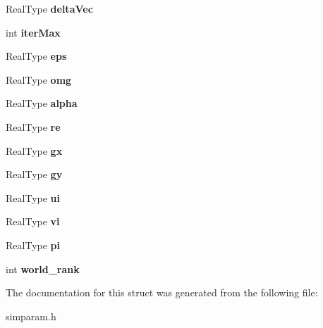 \begin{DoxyCompactItemize}
\item 
\hypertarget{structsimparam_a656107ad929213e2e515214462c8185e}{Real\-Type {\bfseries delta\-Vec}}\label{structsimparam_a656107ad929213e2e515214462c8185e}

\item 
\hypertarget{structsimparam_a79bbef3359096b75c69e9d3ee0e191e9}{int {\bfseries iter\-Max}}\label{structsimparam_a79bbef3359096b75c69e9d3ee0e191e9}

\item 
\hypertarget{structsimparam_aa73922d40040c79309d633bc75888a1f}{Real\-Type {\bfseries eps}}\label{structsimparam_aa73922d40040c79309d633bc75888a1f}

\item 
\hypertarget{structsimparam_ad41bac063fcbdac4cb459585d60b912b}{Real\-Type {\bfseries omg}}\label{structsimparam_ad41bac063fcbdac4cb459585d60b912b}

\item 
\hypertarget{structsimparam_a542c143b3ec3fecd4ba1bd435869c1ad}{Real\-Type {\bfseries alpha}}\label{structsimparam_a542c143b3ec3fecd4ba1bd435869c1ad}

\item 
\hypertarget{structsimparam_a0993ef48f0a704d881f8d6c06372dc6e}{Real\-Type {\bfseries re}}\label{structsimparam_a0993ef48f0a704d881f8d6c06372dc6e}

\item 
\hypertarget{structsimparam_ab9b937c60e739cb22b40f17668236170}{Real\-Type {\bfseries gx}}\label{structsimparam_ab9b937c60e739cb22b40f17668236170}

\item 
\hypertarget{structsimparam_aedf48193c1e7296f01fdc8fdec30c945}{Real\-Type {\bfseries gy}}\label{structsimparam_aedf48193c1e7296f01fdc8fdec30c945}

\item 
\hypertarget{structsimparam_a5d484933d237f50a481fb6daa4f078fd}{Real\-Type {\bfseries ui}}\label{structsimparam_a5d484933d237f50a481fb6daa4f078fd}

\item 
\hypertarget{structsimparam_a24105dba67b582014854444da2b24b42}{Real\-Type {\bfseries vi}}\label{structsimparam_a24105dba67b582014854444da2b24b42}

\item 
\hypertarget{structsimparam_a3537fd6998fdf65cdfe7be22f3044fbe}{Real\-Type {\bfseries pi}}\label{structsimparam_a3537fd6998fdf65cdfe7be22f3044fbe}

\item 
\hypertarget{structsimparam_a99d8d8c8f88600189c0cb8e840205388}{int {\bfseries world\-\_\-rank}}\label{structsimparam_a99d8d8c8f88600189c0cb8e840205388}

\end{DoxyCompactItemize}


The documentation for this struct was generated from the following file\-:\begin{DoxyCompactItemize}
\item 
simparam.\-h\end{DoxyCompactItemize}
